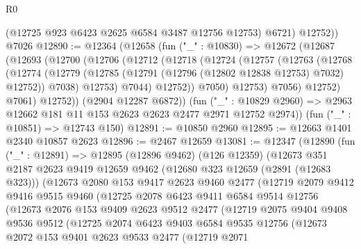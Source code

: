 \begin{lexlean}{R0}
\begin{coremodule}
          (@12725 @923 @6423 @2625 @6584 @3487 @12756 @12753)
          @6721)
        @12752))
    @7026
@12890 := @12364
    (@12658
      (fun ("_" : @10830) =>
      @12672
        (@12687
          (@12693
            (@12700
              (@12706
                (@12712
                  (@12718
                    (@12724
                      (@12757
                        (@12763
                          (@12768
                            (@12774
                              (@12779
                                (@12785 (@12791 (@12796 (@12802 @12838 @12753) @7032) @12752))
                                @7038)
                              @12753)
                            @7044)
                          @12752))
                      @7050)
                    @12753)
                  @7056)
                @12752)
              @7061)
            @12752))
        (@2904 @12287 @6872))
      (fun ("_" : @10829 @2960) => @2963 @12662 @181 @11 @153 @2623 @2623 @2477 @2971 @12752 @2974))
    (fun ("_" : @10851) => @12743 @150)
@12891 := @10850 @2960
@12895 := @12663 @1401 @2340 @10857 @2623
@12896 := @2467 @12659
@13081 := @12347
    (@12890
      (fun ("_" : @12891) =>
      @12895
        (@12896 @9462)
        (@126 @12359)
        (@12673
          @351
          @2187
          @2623
          @9419
          @12659
          @9462
          (@12680 @323 @12659 (@2891 (@12683 @323)))
          (@12673
            @2080
            @153
            @9417
            @2623
            @9460
            @2477
            (@12719
              @2079
              @9412
              @9416
              @9515
              @9460
              (@12725
                @2078
                @6423
                @9411
                @6584
                @9514
                @12756
                (@12673
                  @2076
                  @153
                  @9409
                  @2623
                  @9512
                  @2477
                  (@12719
                    @2075
                    @9404
                    @9408
                    @9536
                    @9512
                    (@12725
                      @2074
                      @6423
                      @9403
                      @6584
                      @9535
                      @12756
                      (@12673
                        @2072
                        @153
                        @9401
                        @2623
                        @9533
                        @2477
                        (@12719
                          @2071

\end{coremodule}
\end{lexlean}
